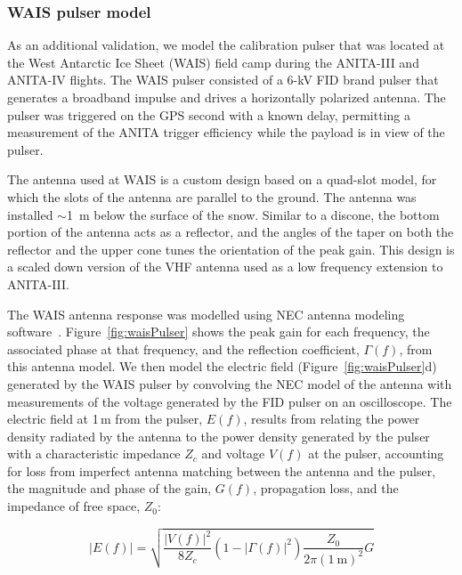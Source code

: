 \subsubsection{WAIS pulser model}
\label{subsec:wais}

As an additional validation, we model the calibration pulser that was located at the West Antarctic Ice Sheet (WAIS) field camp during the ANITA-III and ANITA-IV flights. The WAIS pulser consisted of a 6-kV FID brand pulser that generates a broadband impulse and drives a horizontally polarized antenna. The pulser was triggered on the GPS second with a known delay, permitting a measurement of the  ANITA trigger efficiency while the payload is in view of the pulser.

The antenna used at WAIS is a custom design based on a quad-slot model, for which the slots of the antenna are parallel to the ground. The antenna was installed $\sim$1~m below the surface of the snow. Similar to a discone, the bottom portion of the antenna acts as a reflector, and the angles of the taper on both the reflector and the upper cone tunes the orientation of the peak gain. This design is a scaled down version of the VHF antenna used as a low frequency extension to ANITA-III. 

The WAIS antenna response was modelled using NEC antenna modeling software~\cite{nec}. Figure~\ref{fig:waisPulser} shows the peak gain for each frequency, the associated phase at that frequency, and the reflection coefficient, $\Gamma(f)$, from this antenna model. We then model the electric field (Figure~\ref{fig:waisPulser}d) generated by the WAIS pulser by convolving the NEC model of the antenna with measurements of the voltage generated by the FID pulser on an oscilloscope. The electric field at 1\,m from the pulser, $E(f)$, results from relating the power density radiated by the antenna to the power density generated by the pulser with a characteristic impedance $Z_{c}$ and voltage $V(f)$ at the pulser, accounting for loss from imperfect antenna matching between the antenna and the pulser, the magnitude and phase of the gain, $G(f)$, propagation loss, and the impedance of free space, $Z_0$:

\begin{equation}
|E(f)| = \sqrt{\frac{|V(f)|^2}{8 Z_c} (1 -|\Gamma(f)|^2 ) \frac{Z_0}{2\pi (1~\textrm{m})^2} G}
\end{equation}

